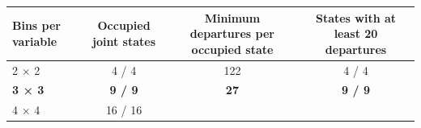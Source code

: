 \documentclass[10pt,]{article}
\begin{document}
\begin{longtable}[]{@{}lccc@{}}
\toprule
\begin{minipage}[b]{0.14\columnwidth}\raggedright\strut
Bins per variable\strut
\end{minipage} & \begin{minipage}[b]{0.18\columnwidth}\centering\strut
Occupied joint states\strut
\end{minipage} & \begin{minipage}[b]{0.30\columnwidth}\centering\strut
Minimum departures per occupied state\strut
\end{minipage} & \begin{minipage}[b]{0.27\columnwidth}\centering\strut
States with at least 20 departures\strut
\end{minipage}\tabularnewline
\midrule
\endhead
\begin{minipage}[t]{0.14\columnwidth}\raggedright\strut
2 × 2\strut
\end{minipage} & \begin{minipage}[t]{0.18\columnwidth}\centering\strut
4 / 4\strut
\end{minipage} & \begin{minipage}[t]{0.30\columnwidth}\centering\strut
122\strut
\end{minipage} & \begin{minipage}[t]{0.27\columnwidth}\centering\strut
4 / 4\strut
\end{minipage}\tabularnewline
\begin{minipage}[t]{0.14\columnwidth}\raggedright\strut
\textbf{3 × 3}\strut
\end{minipage} & \begin{minipage}[t]{0.18\columnwidth}\centering\strut
\textbf{9 / 9}\strut
\end{minipage} & \begin{minipage}[t]{0.30\columnwidth}\centering\strut
\textbf{27}\strut
\end{minipage} & \begin{minipage}[t]{0.27\columnwidth}\centering\strut
\textbf{9 / 9}\strut
\end{minipage}\tabularnewline
\begin{minipage}[t]{0.14\columnwidth}\raggedright\strut
4 × 4\strut
\end{minipage} & \begin{minipage}[t]{0.18\columnwidth}\centering\strut
16 / 16\strut
\end{minipage} & \begin{minipage}[t]{0.30\columnwidth}\centering\strut

\end{minipage}
\end{longtable}
\end{document}
